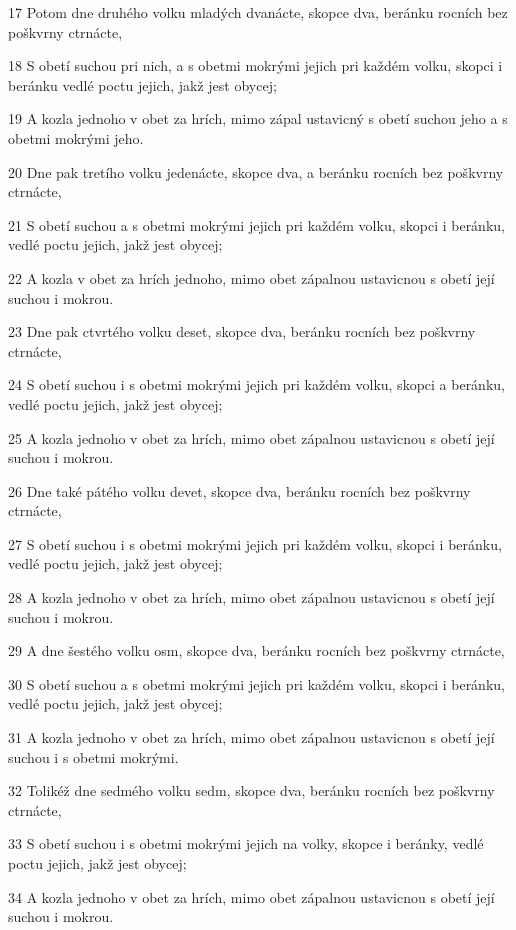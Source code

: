 \par 17 Potom dne druhého volku mladých dvanácte, skopce dva, beránku rocních bez poškvrny ctrnácte,
\par 18 S obetí suchou pri nich, a s obetmi mokrými jejich pri každém volku, skopci i beránku vedlé poctu jejich, jakž jest obycej;
\par 19 A kozla jednoho v obet za hrích, mimo zápal ustavicný s obetí suchou jeho a s obetmi mokrými jeho.
\par 20 Dne pak tretího volku jedenácte, skopce dva, a beránku rocních bez poškvrny ctrnácte,
\par 21 S obetí suchou a s obetmi mokrými jejich pri každém volku, skopci i beránku, vedlé poctu jejich, jakž jest obycej;
\par 22 A kozla v obet za hrích jednoho, mimo obet zápalnou ustavicnou s obetí její suchou i mokrou.
\par 23 Dne pak ctvrtého volku deset, skopce dva, beránku rocních bez poškvrny ctrnácte,
\par 24 S obetí suchou i s obetmi mokrými jejich pri každém volku, skopci a beránku, vedlé poctu jejich, jakž jest obycej;
\par 25 A kozla jednoho v obet za hrích, mimo obet zápalnou ustavicnou s obetí její suchou i mokrou.
\par 26 Dne také pátého volku devet, skopce dva, beránku rocních bez poškvrny ctrnácte,
\par 27 S obetí suchou i s obetmi mokrými jejich pri každém volku, skopci i beránku, vedlé poctu jejich, jakž jest obycej;
\par 28 A kozla jednoho v obet za hrích, mimo obet zápalnou ustavicnou s obetí její suchou i mokrou.
\par 29 A dne šestého volku osm, skopce dva, beránku rocních bez poškvrny ctrnácte,
\par 30 S obetí suchou a s obetmi mokrými jejich pri každém volku, skopci i beránku, vedlé poctu jejich, jakž jest obycej;
\par 31 A kozla jednoho v obet za hrích, mimo obet zápalnou ustavicnou s obetí její suchou i s obetmi mokrými.
\par 32 Tolikéž dne sedmého volku sedm, skopce dva, beránku rocních bez poškvrny ctrnácte,
\par 33 S obetí suchou i s obetmi mokrými jejich na volky, skopce i beránky, vedlé poctu jejich, jakž jest obycej;
\par 34 A kozla jednoho v obet za hrích, mimo obet zápalnou ustavicnou s obetí její suchou i mokrou.
